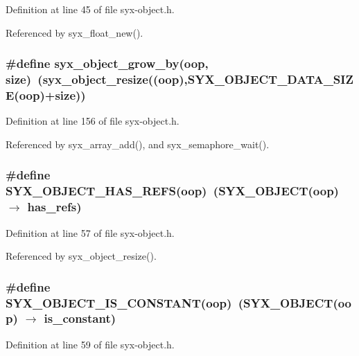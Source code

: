 Definition at line 45 of file syx-object.h.

Referenced by syx\_\-float\_\-new().\hypertarget{syx-object_8h_e164aa1036bfcc0f7e63e2f8e81c0f54}{
\subsubsection{\setlength{\rightskip}{0pt plus 5cm}\#define syx\_\-object\_\-grow\_\-by(oop, \/  size)~(syx\_\-object\_\-resize((oop),SYX\_\-OBJECT\_\-DATA\_\-SIZE(oop)+size))}}
\label{syx-object_8h_e164aa1036bfcc0f7e63e2f8e81c0f54}




Definition at line 156 of file syx-object.h.

Referenced by syx\_\-array\_\-add(), and syx\_\-semaphore\_\-wait().\hypertarget{syx-object_8h_b769a5f497b0d4a69c82db6ab587c96f}{
\subsubsection{\setlength{\rightskip}{0pt plus 5cm}\#define SYX\_\-OBJECT\_\-HAS\_\-REFS(oop)~(SYX\_\-OBJECT(oop) $\rightarrow$ has\_\-refs)}}
\label{syx-object_8h_b769a5f497b0d4a69c82db6ab587c96f}




Definition at line 57 of file syx-object.h.

Referenced by syx\_\-object\_\-resize().\hypertarget{syx-object_8h_e63d2bc397e9f66e55b915520658bb95}{
\subsubsection{\setlength{\rightskip}{0pt plus 5cm}\#define SYX\_\-OBJECT\_\-IS\_\-CONSTANT(oop)~(SYX\_\-OBJECT(oop) $\rightarrow$ is\_\-constant)}}
\label{syx-object_8h_e63d2bc397e9f66e55b915520658bb95}




Definition at line 59 of file syx-object.h.

